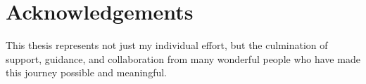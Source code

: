 \documentclass{Configuration_Files/PoliMi3i_thesis}
\begin{document}


\printglossary[type=\acronymtype]

\listoffigures

\listoftables


\chapter*{Acknowledgements}

This thesis represents not just my individual effort, but the culmination of support, guidance, and collaboration from many wonderful people who have made this journey possible and meaningful.
\end{document}
